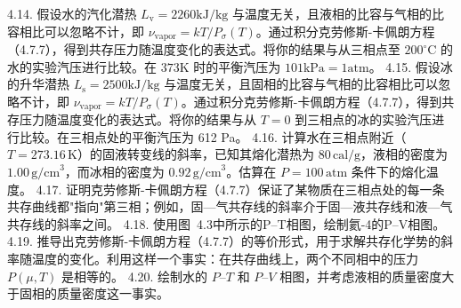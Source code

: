 4.14. 假设水的汽化潜热 \(L_{\mathrm{v}}=2260 \mathrm{kJ} / \mathrm{kg}\) 与温度无关，且液相的比容与气相的比容相比可以忽略不计，即 \(\nu_{\mathrm{vapor}}=k T / P_{\sigma}(T)\)。通过积分克劳修斯-卡佩朗方程（4.7.7），得到共存压力随温度变化的表达式。将你的结果与从三相点至 \(200^{\circ} \mathrm{C}\) 的水的实验汽压进行比较。在 \(373 \mathrm{K}\) 时的平衡汽压为 \(101 \mathrm{kPa}=1 \mathrm{atm}\)。
4.15. 假设冰的升华潜热 \(L_{\mathrm{s}}=2500 \mathrm{kJ} / \mathrm{kg}\) 与温度无关，且固相的比容与气相的比容相比可以忽略不计，即 \(\nu_{\mathrm{vapor}}=k T / P_{\sigma}(T)\)。通过积分克劳修斯-卡佩朗方程（4.7.7），得到共存压力随温度变化的表达式。将你的结果与从 \(T=0\) 到三相点的冰的实验汽压进行比较。在三相点处的平衡汽压为 612 Pa。
4.16. 计算水在三相点附近（\(T = 273.16\,\mathrm{K}\)）的固液转变线的斜率，已知其熔化潜热为 \(80\,\mathrm{cal/g}\)，液相的密度为 \(1.00\,\mathrm{g/cm}^3\)，而冰相的密度为 \(0.92\,\mathrm{g/cm}^3\)。估算在 \(P = 100\,\mathrm{atm}\) 条件下的熔化温度。
4.17. 证明克劳修斯-卡佩朗方程（4.7.7）保证了某物质在三相点处的每一条共存曲线都"指向"第三相；例如，固---气共存线的斜率介于固---液共存线和液---气共存线的斜率之间。
4.18. 使用图~4.3中所示的P--T相图，绘制氦-4的P--V相图。
4.19. 推导出克劳修斯-卡佩朗方程（4.7.7）的等价形式，用于求解共存化学势的斜率随温度的变化。利用这样一个事实：在共存曲线上，两个不同相中的压力 \(P(\mu, T)\) 是相等的。
4.20. 绘制水的 \(P\)--\(T\) 和 \(P\)--\(V\) 相图，并考虑液相的质量密度大于固相的质量密度这一事实。

